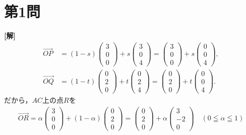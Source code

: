 \documentclass[../main.tex]{subfiles}
\begin{document}
\section*{第1問}

{\bf [解]}
\begin{align}
  \overrightarrow{OP}&=(1-s)
  \begin{pmatrix}3\\0\\0
  \end{pmatrix}
  +s
  \begin{pmatrix}3\\0\\4
  \end{pmatrix}
  =
  \begin{pmatrix}3\\0\\0
  \end{pmatrix}+s
  \begin{pmatrix}0\\0\\4
  \end{pmatrix},\\
  \overrightarrow{OQ}&=(1-t)
  \begin{pmatrix}0\\2\\0
  \end{pmatrix}
  +t
  \begin{pmatrix}0\\2\\4
  \end{pmatrix}
  =
  \begin{pmatrix}0\\2\\0
  \end{pmatrix}+t
  \begin{pmatrix}0\\0\\4
  \end{pmatrix}.
\end{align}
だから，$AC$上の点$R$を
\begin{align}
  \overrightarrow{OR}=\alpha
  \begin{pmatrix}3\\0\\0
  \end{pmatrix}
  +(1-\alpha)
  \begin{pmatrix}0\\2\\0
  \end{pmatrix}
  =
  \begin{pmatrix}0\\2\\0
  \end{pmatrix}+\alpha
  \begin{pmatrix}3\\-2\\0
  \end{pmatrix}
  \quad(0\leqq\alpha\leqq1)
\end{align}
\end{document}
